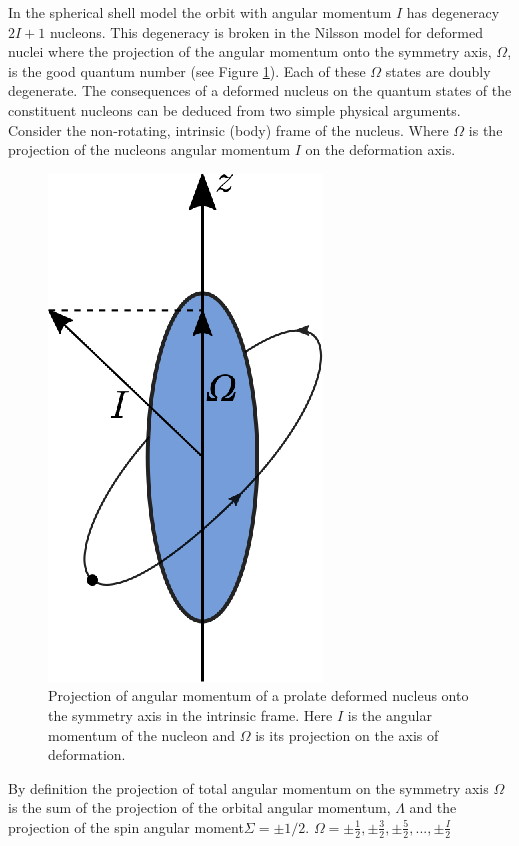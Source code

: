 \documentclass[10pt,a4paper, twoside, openright]{report}
\begin{document}
  In the spherical shell model the orbit with angular momentum $I$ has degeneracy $2I + 1$ nucleons. This degeneracy is broken in the Nilsson model for deformed nuclei where the projection of the angular momentum onto the symmetry axis, $\Omega$, is the good quantum number (see Figure \ref{fig:prolate_AM}). Each of these $\Omega$ states are doubly degenerate. The consequences of a deformed nucleus on the quantum states of the constituent nucleons can be deduced from two simple physical arguments. Consider the non-rotating, intrinsic (body) frame of the nucleus. Where $\Omega$ is the projection of the nucleons angular momentum $I$ on the deformation axis. 
\begin{figure}
\centering
\includegraphics[scale=1]{./figures/prolate_AM.eps}
\caption[Angular moment projections in deformed nuclei]{Projection of angular momentum of a prolate deformed nucleus onto the symmetry axis in the intrinsic frame. Here $I$ is the angular momentum of the nucleon and $\Omega$ is its projection on the axis of deformation.}
\label{fig:prolate_AM}
\end{figure}
By definition the projection of total angular momentum on the symmetry axis $\Omega$ is the sum of the projection of the orbital angular momentum, $\Lambda$ and the projection of the spin angular moment$\Sigma = \pm 1/2$.  $\Omega = \pm\tfrac{1}{2}, \pm\tfrac{3}{2},  \pm\tfrac{5}{2},  ... ,  \pm\tfrac{I}{2}$
\end{document}
